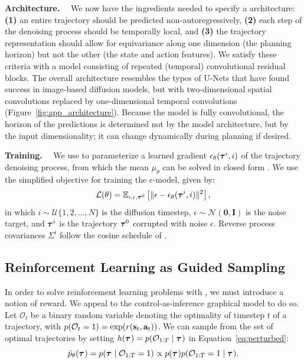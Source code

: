 \textbf{Architecture.}~~
We now have the ingredients needed to specify a \method architecture:
\textbf{(1)} an entire trajectory should be predicted non-autoregressively,
\textbf{(2)} each step of the denoising process should be temporally local, and
\textbf{(3)} the trajectory representation should allow for equivariance  along one dimension (the planning horizon) but not the other (the state and action features).
We satisfy these criteria with a model consisting of repeated (temporal) convolutional residual blocks.
The overall architecture resembles the types of U-Nets that have found success in image-based diffusion models, but with two-dimensional spatial convolutions replaced by one-dimensional temporal convolutions (Figure~\ref{fig:app_architecture}).
Because the model is fully convolutional, the horizon of the predictions is determined not by the model architecture, but by the input dimensionality; it can change dynamically during planning if desired.

\textbf{Training.}~~
We use \method to parameterize a learned gradient $\epsilon_\theta(\bm{\tau}^{i}, i)$ of the trajectory denoising process, from which the mean $\mu_\theta$ can be solved in closed form \citep{ho2020denoising}.
We use the simplified objective for training the $\epsilon$-model, given by:
\[
\mathcal{L}(\theta) = \mathbb{E}_{
    i,\epsilon,\bm{\tau}^{0}
    } \left[ 
    \lVert \epsilon - \epsilon_\theta(\bm{\tau}^{i}, i) \rVert^2
     \right],
\]
in which $i \sim \mathcal{U}\{1, 2, \ldots, N\}$ is the diffusion timestep, $\epsilon \sim \mathcal{N}(\bm{0}, \bm{I})$ is the noise target, and $\bm{\tau}^{i}$ is the trajectory $\bm{\tau}^{0}$ corrupted with noise $\epsilon$.
Reverse process covariances $\Sigma^i$ follow the cosine schedule of \citet{nichol2021improved}.





\subsection{Reinforcement Learning as Guided Sampling}
\label{sec:guided}

In order to solve reinforcement learning problems with \method, we must introduce a notion of reward.
We appeal to the control-as-inference graphical model \citep{levine2018reinforcement} to do so.
Let $\mathcal{O}_{t}$ be a binary random variable denoting the optimality of timestep $t$ of a trajectory, with ${p(\mathcal{O}_t=1) = \exp(r(\mathbf{s}_t, \mathbf{a}_t))}$. We can sample from the set of optimal trajectories by setting ${h(\bm{\tau}^{}) = p(\mathcal{O}_{1:T} \mid \bm{\tau}^{})}$ in Equation~\ref{eq:perturbed}:
\[
\tilde{p}_\theta(\bm{\tau}^{}) = p(\bm{\tau}^{} \mid \mathcal{O}_{1:T}=1) \propto p(\bm{\tau}^{}) p(\mathcal{O}_{1:T}=1 \mid \bm{\tau}^{}).
\]

